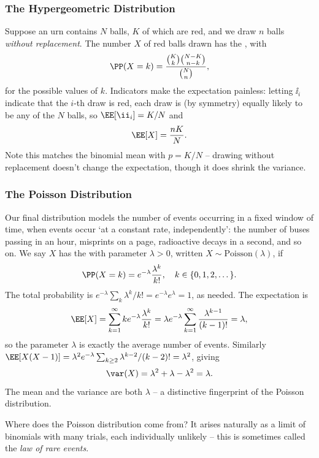 \subsubsection*{The Hypergeometric Distribution}

Suppose an urn contains $N$ balls, $K$ of which are red, and we draw $n$ balls \emph{without replacement}. The number $X$ of red balls drawn has the , with
$$
\PP(X = k) = \frac{\binom{K}{k}\binom{N - K}{n - k}}{\binom{N}{n}},
$$
for the possible values of $k$. Indicators make the expectation painless: letting $\ii_i$ indicate that the $i$-th draw is red, each draw is (by symmetry) equally likely to be any of the $N$ balls, so $\EE[\ii_i] = K/N$ and
$$
\EE[X] = \frac{nK}{N}.
$$
Note this matches the binomial mean with $p = K/N$ -- drawing without replacement doesn't change the expectation, though it does shrink the variance.

\subsubsection*{The Poisson Distribution}

Our final distribution models the number of events occurring in a fixed window of time, when events occur `at a constant rate, independently': the number of buses passing in an hour, misprints on a page, radioactive decays in a second, and so on. We say $X$ has the  with parameter $\lambda > 0$, written $X \sim \mathrm{Poisson}(\lambda)$, if
$$
\PP(X = k) = e^{-\lambda}\frac{\lambda^k}{k!}, \quad k \in \{0, 1, 2, \dots\}.
$$
The total probability is $e^{-\lambda}\sum_k \lambda^k / k! = e^{-\lambda}e^{\lambda} = 1$, as needed. The expectation is
$$
\EE[X] = \sum_{k = 1}^{\infty} k e^{-\lambda} \frac{\lambda^k}{k!} = \lambda e^{-\lambda} \sum_{k = 1}^{\infty} \frac{\lambda^{k - 1}}{(k-1)!} = \lambda,
$$
so the parameter $\lambda$ is exactly the average number of events. Similarly $\EE[X(X-1)] = \lambda^2 e^{-\lambda}\sum_{k \geq 2} \lambda^{k-2}/(k-2)! = \lambda^2$, giving
$$
\var(X) = \lambda^2 + \lambda - \lambda^2 = \lambda.
$$
The mean and the variance are both $\lambda$ -- a distinctive fingerprint of the Poisson distribution.

Where does the Poisson distribution come from? It arises naturally as a limit of binomials with many trials, each individually unlikely -- this is sometimes called the \emph{law of rare events}.

